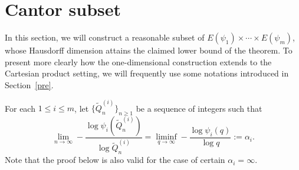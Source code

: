 \documentclass[11pt]{amsart}
\numberwithin{equation}{section}
\newcommand{\0}{\mathbf{0}}
\theoremstyle{remark}
\newtheorem{lem}{\bf Lemma}[section]
\begin{document}
{%

\section{Cantor subset}\label{sec3}
In this section, we will construct a reasonable subset of $E(\psi_1)\times\cdots\times E(\psi_m)$, whose Hausdorff dimension attains the claimed lower bound of the theorem. To present more clearly how the one-dimensional construction extends to the Cartesian product setting, we will frequently use some notations introduced in Section~\ref{pre}.

For each $1\le i\le m$, let $\{\widetilde{Q}_n^{(i)}\}_{n\ge 1}$ be a sequence of integers such that
$$\lim_{n\rightarrow\infty}-\frac{\log \psi_i(\widetilde{Q}_n^{(i)})}{\log \widetilde{Q}_n^{(i)}}=\liminf_{q\rightarrow\infty}-\frac{\log \psi_i(q)}{\log q}:=\alpha_i.$$
Note that the proof below is also valid for the case of certain $\alpha_i=\infty$.


}
\end{document}
